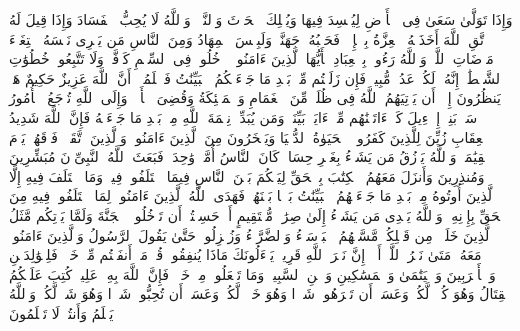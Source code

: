 \stopbuffer
\startbuffer[\q:2:205]
وَإِذَا تَوَلَّىٰ سَعَىٰ فِی ٱلۡأَرۡضِ لِیُفۡسِدَ فِیهَا وَیُهۡلِكَ ٱلۡحَرۡثَ وَٱلنَّسۡلَۗ وَٱللَّهُ لَا یُحِبُّ ٱلۡفَسَادَ%
\stopbuffer
\startbuffer[\q:2:206]
وَإِذَا قِیلَ لَهُ ٱتَّقِ ٱللَّهَ أَخَذَتۡهُ ٱلۡعِزَّةُ بِٱلۡإِثۡمِۚ فَحَسۡبُهُۥ جَهَنَّمُۖ وَلَبِئۡسَ ٱلۡمِهَادُ%
\stopbuffer
\startbuffer[\q:2:207]
وَمِنَ ٱلنَّاسِ مَن یَشۡرِی نَفۡسَهُ ٱبۡتِغَاۤءَ مَرۡضَاتِ ٱللَّهِۗ وَٱللَّهُ رَءُوفُۢ بِٱلۡعِبَادِ%
\stopbuffer
\startbuffer[\q:2:208]
یَٰۤأَیُّهَا ٱلَّذِینَ ءَامَنُوا۟ ٱدۡخُلُوا۟ فِی ٱلسِّلۡمِ كَاۤفَّةࣰ وَلَا تَتَّبِعُوا۟ خُطُوَٰتِ ٱلشَّیۡطَٰنِۚ إِنَّهُۥ لَكُمۡ عَدُوࣱّ مُّبِینࣱ%
\stopbuffer
\startbuffer[\q:2:209]
فَإِن زَلَلۡتُم مِّنۢ بَعۡدِ مَا جَاۤءَتۡكُمُ ٱلۡبَیِّنَٰتُ فَٱعۡلَمُوۤا۟ أَنَّ ٱللَّهَ عَزِیزٌ حَكِیمٌ%
\stopbuffer
\startbuffer[\q:2:210]
هَلۡ یَنظُرُونَ إِلَّاۤ أَن یَأۡتِیَهُمُ ٱللَّهُ فِی ظُلَلࣲ مِّنَ ٱلۡغَمَامِ وَٱلۡمَلَٰۤئِكَةُ وَقُضِیَ ٱلۡأَمۡرُۚ وَإِلَى ٱللَّهِ تُرۡجَعُ ٱلۡأُمُورُ%
\stopbuffer
\startbuffer[\q:2:211]
سَلۡ بَنِیۤ إِسۡرَٰۤءِیلَ كَمۡ ءَاتَیۡنَٰهُم مِّنۡ ءَایَةِۭ بَیِّنَةࣲۗ وَمَن یُبَدِّلۡ نِعۡمَةَ ٱللَّهِ مِنۢ بَعۡدِ مَا جَاۤءَتۡهُ فَإِنَّ ٱللَّهَ شَدِیدُ ٱلۡعِقَابِ%
\stopbuffer
\startbuffer[\q:2:212]
زُیِّنَ لِلَّذِینَ كَفَرُوا۟ ٱلۡحَیَوٰةُ ٱلدُّنۡیَا وَیَسۡخَرُونَ مِنَ ٱلَّذِینَ ءَامَنُوا۟ۘ وَٱلَّذِینَ ٱتَّقَوۡا۟ فَوۡقَهُمۡ یَوۡمَ ٱلۡقِیَٰمَةِۗ وَٱللَّهُ یَرۡزُقُ مَن یَشَاۤءُ بِغَیۡرِ حِسَابࣲ%
\stopbuffer
\startbuffer[\q:2:213]
كَانَ ٱلنَّاسُ أُمَّةࣰ وَٰحِدَةࣰ فَبَعَثَ ٱللَّهُ ٱلنَّبِیِّۦنَ مُبَشِّرِینَ وَمُنذِرِینَ وَأَنزَلَ مَعَهُمُ ٱلۡكِتَٰبَ بِٱلۡحَقِّ لِیَحۡكُمَ بَیۡنَ ٱلنَّاسِ فِیمَا ٱخۡتَلَفُوا۟ فِیهِۚ وَمَا ٱخۡتَلَفَ فِیهِ إِلَّا ٱلَّذِینَ أُوتُوهُ مِنۢ بَعۡدِ مَا جَاۤءَتۡهُمُ ٱلۡبَیِّنَٰتُ بَغۡیَۢا بَیۡنَهُمۡۖ فَهَدَى ٱللَّهُ ٱلَّذِینَ ءَامَنُوا۟ لِمَا ٱخۡتَلَفُوا۟ فِیهِ مِنَ ٱلۡحَقِّ بِإِذۡنِهِۦۗ وَٱللَّهُ یَهۡدِی مَن یَشَاۤءُ إِلَىٰ صِرَٰطࣲ مُّسۡتَقِیمٍ%
\stopbuffer
\startbuffer[\q:2:214]
أَمۡ حَسِبۡتُمۡ أَن تَدۡخُلُوا۟ ٱلۡجَنَّةَ وَلَمَّا یَأۡتِكُم مَّثَلُ ٱلَّذِینَ خَلَوۡا۟ مِن قَبۡلِكُمۖ مَّسَّتۡهُمُ ٱلۡبَأۡسَاۤءُ وَٱلضَّرَّاۤءُ وَزُلۡزِلُوا۟ حَتَّىٰ یَقُولَ ٱلرَّسُولُ وَٱلَّذِینَ ءَامَنُوا۟ مَعَهُۥ مَتَىٰ نَصۡرُ ٱللَّهِۗ أَلَاۤ إِنَّ نَصۡرَ ٱللَّهِ قَرِیبࣱ%
\stopbuffer
\startbuffer[\q:2:215]
یَسۡءَلُونَكَ مَاذَا یُنفِقُونَۖ قُلۡ مَاۤ أَنفَقۡتُم مِّنۡ خَیۡرࣲ فَلِلۡوَٰلِدَیۡنِ وَٱلۡأَقۡرَبِینَ وَٱلۡیَتَٰمَىٰ وَٱلۡمَسَٰكِینِ وَٱبۡنِ ٱلسَّبِیلِۗ وَمَا تَفۡعَلُوا۟ مِنۡ خَیۡرࣲ فَإِنَّ ٱللَّهَ بِهِۦ عَلِیمࣱ%
\stopbuffer
\startbuffer[\q:2:216]
كُتِبَ عَلَیۡكُمُ ٱلۡقِتَالُ وَهُوَ كُرۡهࣱ لَّكُمۡۖ وَعَسَىٰۤ أَن تَكۡرَهُوا۟ شَیۡءࣰا وَهُوَ خَیۡرࣱ لَّكُمۡۖ وَعَسَىٰۤ أَن تُحِبُّوا۟ شَیۡءࣰا وَهُوَ شَرࣱّ لَّكُمۡۗ وَٱللَّهُ یَعۡلَمُ وَأَنتُمۡ لَا تَعۡلَمُونَ%
